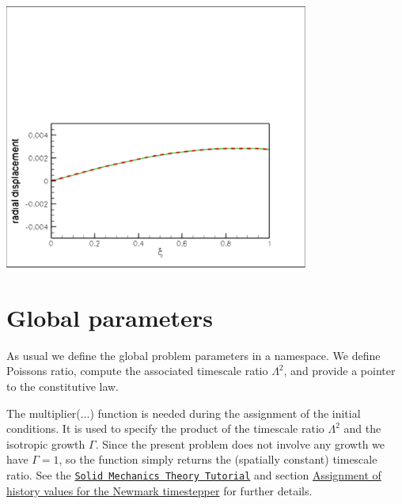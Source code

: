  
\begin{DoxyImage}
\includegraphics[width=0.75\textwidth]{line_displ}
\end{DoxyImage}




 

\hypertarget{index_namespace}{}\section{Global parameters}\label{index_namespace}
As usual we define the global problem parameters in a namespace. We define Poisson\textquotesingle{}s ratio, compute the associated timescale ratio $ \Lambda^2 $, and provide a pointer to the constitutive law.

The {\ttfamily multiplier}(...) function is needed during the assignment of the initial conditions. It is used to specify the product of the timescale ratio $ \Lambda^2 $ and the isotropic growth $ \Gamma $. Since the present problem does not involve any growth we have $ \Gamma = 1 $, so the function simply returns the (spatially constant) timescale ratio. See the \href{../../solid_theory/html/index.html#Solid_IC}{\tt Solid Mechanics Theory Tutorial} and section \hyperlink{index_newmark_ic}{Assignment of history values for the Newmark timestepper} for further details.

